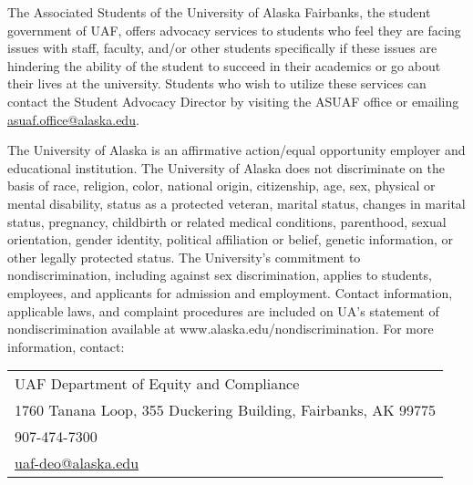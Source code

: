 \documentclass[11pt]{article}
\def\mailto#1{\href{mailto:#1}{#1}}
\begin{document}
The Associated Students of the University of Alaska Fairbanks, the student government of UAF, offers advocacy services to students who feel they are facing issues with staff, faculty, and/or other students specifically if these issues are hindering the ability of the student to succeed in their academics or go about their lives at the university. Students who wish to utilize these services can contact the Student Advocacy Director by visiting the ASUAF office or emailing \mailto{asuaf.office@alaska.edu}.

The University of Alaska is an affirmative action/equal opportunity employer and educational institution. The University of Alaska does not discriminate on the basis of race, religion, color, national origin, citizenship, age, sex, physical or mental disability, status as a protected veteran, marital status, changes in marital status, pregnancy, childbirth or related medical conditions, parenthood, sexual orientation, gender identity, political affiliation or belief, genetic information, or other legally protected status. The University's commitment to nondiscrimination, including against sex discrimination, applies to students, employees, and applicants for admission and employment. Contact information, applicable laws, and complaint procedures are included on UA's statement of nondiscrimination available at www.alaska.edu/nondiscrimination. For more information, contact:

\begin{tabular}{l}
UAF Department of Equity and Compliance\\
1760 Tanana Loop, 355 Duckering Building, Fairbanks, AK  99775\\
907-474-7300\\
\mailto{uaf-deo@alaska.edu}
\end{tabular}
\end{document}
